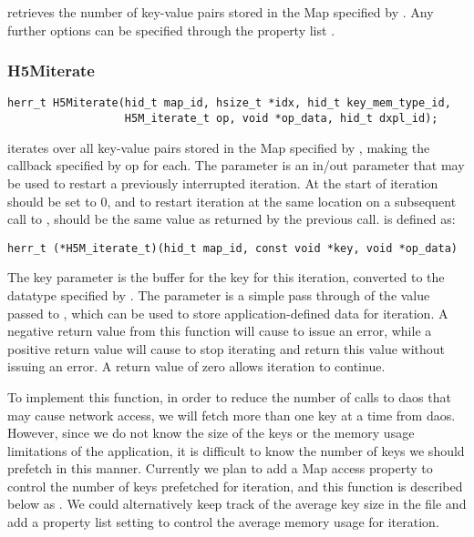 \documentclass[../design_doc.tex]{subfiles}
\begin{document}
 retrieves the number of key-value pairs stored in the Map specified by . Any further options can be specified through the property list .

\subsubsection{H5Miterate}

\begin{verbatim}
herr_t H5Miterate(hid_t map_id, hsize_t *idx, hid_t key_mem_type_id,
                  H5M_iterate_t op, void *op_data, hid_t dxpl_id);
\end{verbatim}

 iterates over all key-value pairs stored in the Map specified by , making the callback specified by op for each. The  parameter is an in/out parameter that may be used to restart a previously interrupted iteration. At the start of iteration  should be set to 0, and to restart iteration at the same location on a subsequent call to ,  should be the same value as returned by the previous call.
 is defined as:
\begin{verbatim}
herr_t (*H5M_iterate_t)(hid_t map_id, const void *key, void *op_data)
\end{verbatim}

The key parameter is the buffer for the key for this iteration, converted to the datatype specified by . The  parameter is a simple pass through of the value passed to , which can be used to store application-defined data for iteration. A negative return value from this function will cause  to issue an error, while a positive return value will cause  to stop iterating and return this value without issuing an error. A return value of zero allows iteration to continue.

To implement this function, in order to reduce the number of calls to \acrshort{daos} that may cause network access, we will fetch more than one key at a time from \acrshort{daos}. However, since we do not know the size of the keys or the memory usage limitations of the application, it is difficult to know the number of keys we should prefetch in this manner. Currently we plan to add a Map access property to control the number of keys prefetched for iteration, and this function is described below as . We could alternatively keep track of the average key size in the file and add a property list setting to control the average memory usage for iteration.
\end{document}
